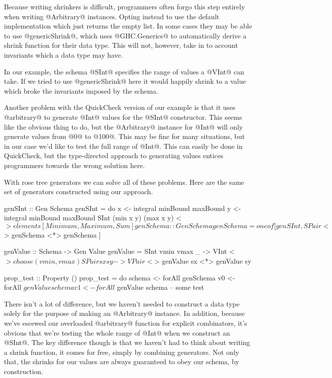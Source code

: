 Because writing shrinkers is difficult, programmers often forgo this step entirely when writing @Arbitrary@ instances. Opting instead to use the default implementation which just returns the empty list. In some cases they may be able to use @genericShrink@, which uses @GHC.Generics@ to automatically derive a shrink function for their data type. This will not, however, take in to account invariants which a data type may have. 

In our example, the schema @SInt@ specifies the range of values a @VInt@ can take. If we tried to use @genericShrink@ here it would happily shrink to a value which broke the invariants imposed by the schema.

Another problem with the QuickCheck version of our example is that it uses @arbitrary@ to generate @Int@ values for the @SInt@ constructor. This seems like the obvious thing to do, but the @Arbitrary@ instance for @Int@ will only generate values from @0@ to @100@. This may be fine for many situations, but in our case we'd like to test the full range of @Int@. This can easily be done in QuickCheck, but the type-directed approach to generating values entices programmers towards the wrong solution here. 

With rose tree generators we can solve all of these problems. Here are the same set of generators constructed using our approach.

\begin{code}
  genSInt :: Gen Schema
  genSInt = do
    x <- integral minBound maxBound
    y <- integral minBound maxBound
    SInt (min x y) (max x y)
      <$> elements [Minimum, Maximum, Sum]

  genSchema :: Gen Schema
  genSchema =
    oneof [
        genSInt
      , SPair <$> genSchema <*> genSchema
      ]

  genValue :: Schema -> Gen Value
  genValue = \case
    SInt vmin vmax _ ->
      VInt <$> choose (vmin, vmax)
    SPair sx sy ->
      VPair <$> genValue sx <*> genValue sy

  prop_test :: Property ()
  prop_test = do
    schema <- forAll genSchema
    v0 <- forAll $ genValue schema
    v1 <- forAll $ genValue schema
    -- some test
\end{code}

There isn't a lot of difference, but we haven't needed to construct a data type solely for the purpose of making an @Arbitrary@ instance. In addition, because we've escewed our overloaded @arbitrary@ function for explicit combinators, it's obvious that we're testing the whole range of @Int@ when we construct an @SInt@. The key difference though is that we haven't had to think about writing a shrink function, it comes for free, simply by combining generators. Not only that, the shrinks for our values are always guaranteed to obey our schema, by construction.
